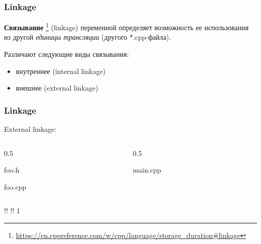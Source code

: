 \documentclass[compress, 8pt, aspectratio=169]{beamer}
\begin{document}
\begin{frame}[fragile]

    \frametitle{Linkage}

    \textbf{Связывание}
    \footnote{\url{https://en.cppreference.com/w/cpp/language/storage\_duration\#linkage}}
    (linkage) переменной определяет возможность ее использования из другой
    \textit{единицы трансляции} (другого *.cpp-файла).

    \hfill \break
    Различают следующие виды связывания:

    \begin{itemize}
        \item внутреннее (internal linkage)
        \item внешнее (external linkage)
    \end{itemize}

\end{frame}

\begin{frame}[fragile]

    \frametitle{Linkage}

    External linkage:

    \begin{columns}[T]
        \begin{column}{0.5\textwidth}

                {foo.h}

                {foo.cpp}

        \end{column}
        \begin{column}{0.5\textwidth}

                {main.cpp}

        \end{column}
    \end{columns}

    \begin{terminalwindow}
!!
!!
1
    \end{terminalwindow}

\end{frame}
\end{document}
